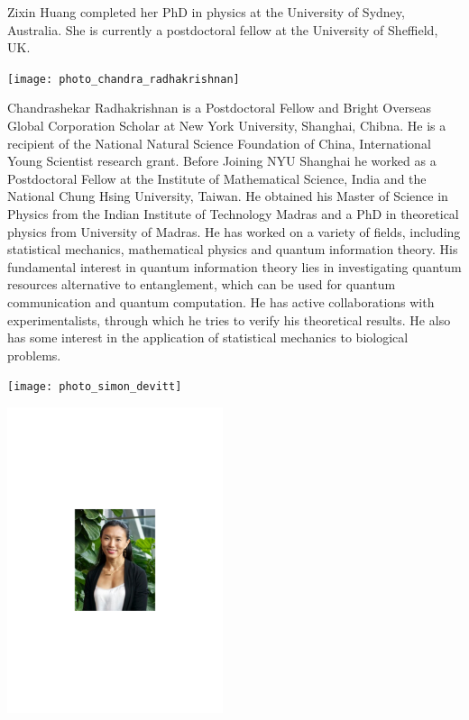 Zixin Huang completed her PhD in physics at the University of Sydney, Australia. She is currently a postdoctoral fellow at the University of Sheffield, UK.


%
%

\begin{center}
\texttt{[image: photo\_chandra\_radhakrishnan]}
\end{center}

Chandrashekar Radhakrishnan is a Postdoctoral Fellow and Bright Overseas Global Corporation Scholar at New York University, Shanghai, Chibna. He is a recipient of the National Natural Science Foundation of China, International Young Scientist research grant. Before Joining NYU Shanghai he worked as a Postdoctoral Fellow at the Institute of Mathematical Science, India and the National Chung Hsing University, Taiwan. He obtained his Master of Science in Physics from the Indian Institute of Technology Madras and a PhD in theoretical physics from University of Madras. He has worked on a variety of fields, including statistical mechanics, mathematical physics and quantum information theory. His fundamental interest in quantum information theory lies in investigating quantum resources alternative to entanglement, which can be used for quantum communication and quantum computation. He has active collaborations with experimentalists, through which he tries to verify his theoretical results. He also has some interest in the application of statistical mechanics to biological problems.

%
%

\begin{center}
\texttt{[image: photo\_simon\_devitt]}
\end{center}


%
%

\begin{center}
\includegraphics[clip=true, width=0.475\textwidth]{photo_sihui_tan}
\end{center}

